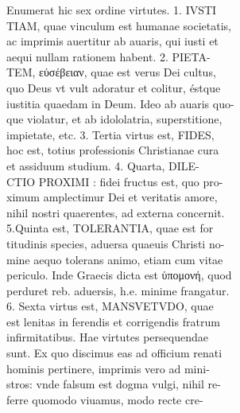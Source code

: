 \documentclass{article}
\begin{document}
\begin{pages}
{                }Enumerat hic sex ordine virtutes. 1. IVSTI \\
                TIAM, quae vinculum est humanae societatis, \\
                ac imprimis auertitur ab auaris, qui iusti et \\
                aequi nullam rationem habent. 2. PIETA- \\
                TEM, εὐσέβειαν, quae est verus Dei cultus, \\
                quo Deus vt vult adoratur et colitur, éstque \\
                iustitia quaedam in Deum. Ideo ab auaris quo- \\
                que violatur, et ab idololatria, superstitione, \\
                impietate, etc. 3. Tertia virtus est, FIDES, \\
                hoc est, totius professionis Christianae cura \\
                et assiduum studium. 4. Quarta, DILE- \\
                CTIO PROXIMI : fidei fructus est, quo pro- \\
                ximum amplectimur Dei et veritatis amore, \\
                nihil nostri quaerentes, ad externa concernit. \\
                5.Quinta est, TOLERANTIA, quae est for \\
                titudinis species, aduersa quaeuis Christi no- \\
                mine aequo tolerans animo, etiam cum vitae \\
                periculo. Inde Graecis dicta est ὑπομονή, quod \\
                perduret reb. aduersis, h.e. minime frangatur. \\
                6. Sexta virtus est, MANSVETVDO, quae \\
                est lenitas in ferendis et corrigendis fratrum \\
                infirmitatibus. Hae virtutes persequendae \\
                sunt. Ex quo discimus eas ad officium renati \\
                hominis pertinere, imprimis vero ad mini- \\
                stros: vnde falsum est dogma vulgi, nihil re- \\
                ferre quomodo viuamus, modo recte cre- \\

\end{pages}
\end{document}

